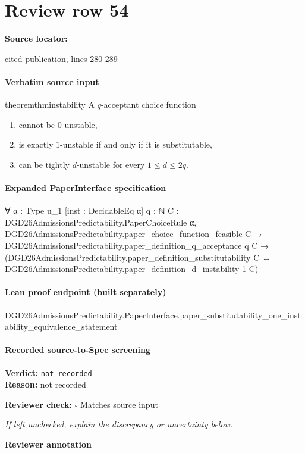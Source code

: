 \documentclass[10pt]{article}
\newcommand{\reviewerbox}{%
  \par\noindent\fbox{\parbox{0.96\linewidth}{\rule{0pt}{0.38in}}}\par
}
\newcommand{\reviewmatch}[1]{%
  \par\noindent\textbf{Reviewer check:} $\square$\; #1\par
  \noindent\emph{If left unchecked, explain the discrepancy or uncertainty below.}\par
}
\begin{document}
\section*{Review row 54}
\textbf{Source locator:} {\footnotesize\raggedright cited publication, lines 280-\allowbreak{}289\par}
\paragraph{Verbatim source input}
\begin{ReviewVerbatim}
\begin{restatable}{theorem}{thminstability}
\label{thm:instability}
A $q$-acceptant choice function
\begin{enumerate}
    \item cannot be $0$-unstable,
    \item  is exactly $1$-unstable if and only if it is substitutable,
    \item can be tightly $d$-unstable for every $1\leq d \leq 2q$.
\end{enumerate}

\end{restatable}%
\end{ReviewVerbatim}


\paragraph{Expanded PaperInterface specification}
\begin{ReviewVerbatim}
∀ {α : Type u_1} [inst : DecidableEq α] {q : ℕ} {C : DGD26AdmissionsPredictability.PaperChoiceRule α},
  DGD26AdmissionsPredictability.paper_choice_function_feasible C →
    DGD26AdmissionsPredictability.paper_definition_q_acceptance q C →
      (DGD26AdmissionsPredictability.paper_definition_substitutability C ↔
        DGD26AdmissionsPredictability.paper_definition_d_instability 1 C)
\end{ReviewVerbatim}

\paragraph{Lean proof endpoint (built separately)}\begin{ReviewVerbatim}
DGD26AdmissionsPredictability.PaperInterface.paper_substitutability_one_instability_equivalence_statement
\end{ReviewVerbatim}

\paragraph{Recorded source-to-Spec screening}
\textbf{Verdict:} \texttt{not recorded}
\\
\textbf{Reason:} not recorded
\reviewmatch{Matches source input}
\noindent\textbf{Reviewer annotation}\par
\reviewerbox
\clearpage
\hypertarget{source-claim-d2442dd19c06f77a}{}
\end{document}
